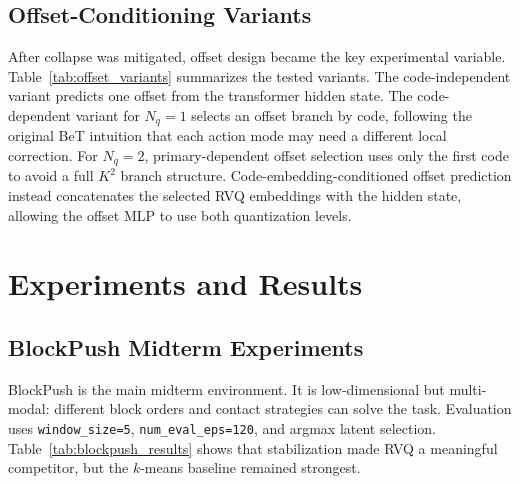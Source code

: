 \documentclass[conference]{IEEEtran}
\begin{document}
\subsection{Offset-Conditioning Variants}

After collapse was mitigated, offset design became the key experimental variable. Table~\ref{tab:offset_variants} summarizes the tested variants. The code-independent variant predicts one offset from the transformer hidden state. The code-dependent variant for $N_q{=}1$ selects an offset branch by code, following the original BeT intuition that each action mode may need a different local correction. For $N_q{=}2$, primary-dependent offset selection uses only the first code to avoid a full $K^2$ branch structure. Code-embedding-conditioned offset prediction instead concatenates the selected RVQ embeddings with the hidden state, allowing the offset MLP to use both quantization levels.

\begin{table}[t]
\centering
\caption{Offset-conditioning variants.}
\label{tab:offset_variants}
\end{table}

\section{Experiments and Results}

\subsection{BlockPush Midterm Experiments}

BlockPush is the main midterm environment. It is low-dimensional but multi-modal: different block orders and contact strategies can solve the task. Evaluation uses \texttt{window\_size=5}, \texttt{num\_eval\_eps=120}, and argmax latent selection. Table~\ref{tab:blockpush_results} shows that stabilization made RVQ a meaningful competitor, but the $k$-means baseline remained strongest.
\end{document}

